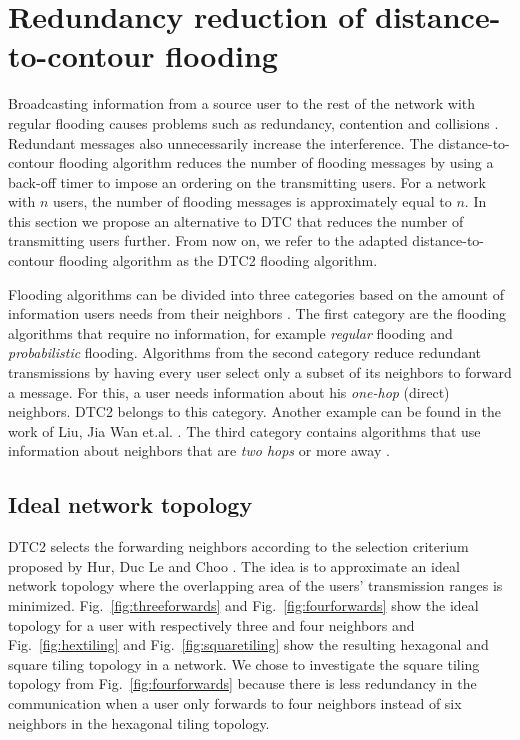 


\section{Redundancy reduction of distance-to-contour flooding}\label{sec:contri2}

Broadcasting information from a source user to the rest of the network with regular flooding causes problems such as redundancy, contention and collisions \cite{storm}. Redundant messages also unnecessarily increase the interference.  The distance-to-contour flooding algorithm reduces the number of flooding messages by using a back-off timer to impose an ordering on the transmitting users. For a network with $n$ users, the number of flooding messages is approximately equal to $n$. In this section we propose an alternative to DTC that reduces the number of transmitting users further. From now on, we refer to the adapted distance-to-contour flooding algorithm as the DTC2 flooding algorithm. 

Flooding algorithms can be divided into three categories based on the amount of information users needs from their neighbors \cite{1hopflooding}. The first category are the flooding algorithms that require no information, for example \textit{regular} flooding and \textit{probabilistic} flooding. Algorithms from the second category reduce redundant transmissions by having every user select only a subset of its neighbors to forward a message. For this, a user needs information about his \textit{one-hop} (direct) neighbors. DTC2 belongs to this category. Another example can be found in the work of Liu, Jia Wan et.al. \cite{1hopflooding}. The third category contains algorithms that use information about neighbors that are \textit{two hops} or more away \cite{2hop}. 

\subsection{Ideal network topology}

DTC2 selects the forwarding neighbors according to the selection criterium proposed by Hur, Duc Le and Choo \cite{dtc2}. The idea is to approximate an ideal network topology where the overlapping area of the users' transmission ranges is minimized. Fig.~\ref{fig:threeforwards} and Fig.~\ref{fig:fourforwards} show the ideal topology for a user with respectively three and four neighbors and Fig.~\ref{fig:hextiling} and Fig.~\ref{fig:squaretiling} show the resulting hexagonal and square tiling topology in a network. We chose to investigate the square tiling topology from Fig.~\ref{fig:fourforwards} because there is less redundancy in the communication when a user only forwards to four neighbors instead of six neighbors in the hexagonal tiling topology.

